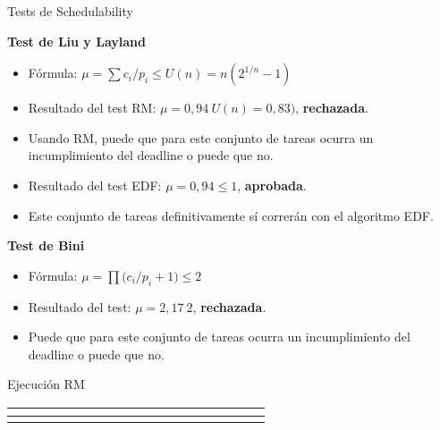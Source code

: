 \documentclass{beamer}
\begin{document}
\begin{frame}{Tests de Schedulability} 
\begin{small} 
\textbf{Test de Liu y Layland} 
\begin{itemize} 
\item Fórmula: \( \mu = \sum{ c_{i} / p_{i}}  \leq U(n) =  n(2^{1/n} - 1)  \) 
\item Resultado del test RM: \( \mu = 0,94\> U(n) = 0,83)\), \textbf{rechazada}. 
\item Usando RM, puede que para este conjunto de tareas ocurra un incumplimiento del deadline o puede que no.
\item Resultado del test EDF: \( \mu = 0,94\leq 1 \), \textbf{aprobada}. 
\item Este conjunto de tareas definitivamente sí correrán con el algoritmo EDF.
\end{itemize} 
\textbf{Test de Bini} 
\begin{itemize} 
\item Fórmula: \( \mu = \prod{ (c_{i} / p_{i}} + 1 ) \leq 2\) 
\item Resultado del test: \( \mu =2,17\> 2 \), \textbf{rechazada}. 
\item Puede que para este conjunto de tareas ocurra un incumplimiento del deadline o puede que no.
\end{itemize} 
\end{small} 
\end{frame} 
\begin{frame}{Ejecución RM} 
\begin{center} 
\begin{tabular}{cccccccccccccccccc} 
\hline 
\multicolumn{1}{|l|}{\cellcolor[HTML]{34FF34}} &\multicolumn{1}{|l|}{\cellcolor[HTML]{34FF34}} &\multicolumn{1}{|l|}{\cellcolor[HTML]{34FF34}} &\multicolumn{1}{|l|}{} &\multicolumn{1}{|l|}{} &\multicolumn{1}{|l|}{} &\multicolumn{1}{|l|}{\cellcolor[HTML]{34FF34}} &\multicolumn{1}{|l|}{\cellcolor[HTML]{34FF34}} &\multicolumn{1}{|l|}{\cellcolor[HTML]{34FF34}} &\multicolumn{1}{|l|}{\cellcolor[HTML]{000000}} &\multicolumn{1}{|l|}{} &\multicolumn{1}{|l|}{} &\multicolumn{1}{|l|}{} &\multicolumn{1}{|l|}{} &\multicolumn{1}{|l|}{} &\multicolumn{1}{|l|}{} &\multicolumn{1}{|l|}{} &\multicolumn{1}{|l|}{} \\ \hline 
\multicolumn{1}{|l|}{} &\multicolumn{1}{|l|}{} &\multicolumn{1}{|l|}{} &\multicolumn{1}{|l|}{\cellcolor[HTML]{FE0000}} &\multicolumn{1}{|l|}{\cellcolor[HTML]{FE0000}} &\multicolumn{1}{|l|}{\cellcolor[HTML]{FE0000}} &\multicolumn{1}{|l|}{} &\multicolumn{1}{|l|}{} &\multicolumn{1}{|l|}{} &\multicolumn{1}{|l|}{\cellcolor[HTML]{000000}} &\multicolumn{1}{|l|}{} &\multicolumn{1}{|l|}{} &\multicolumn{1}{|l|}{} &\multicolumn{1}{|l|}{} &\multicolumn{1}{|l|}{} &\multicolumn{1}{|l|}{} &\multicolumn{1}{|l|}{} &\multicolumn{1}{|l|}{} \\ \hline 
\end{tabular}%
\end{center} 
\end{frame}
\end{document}
